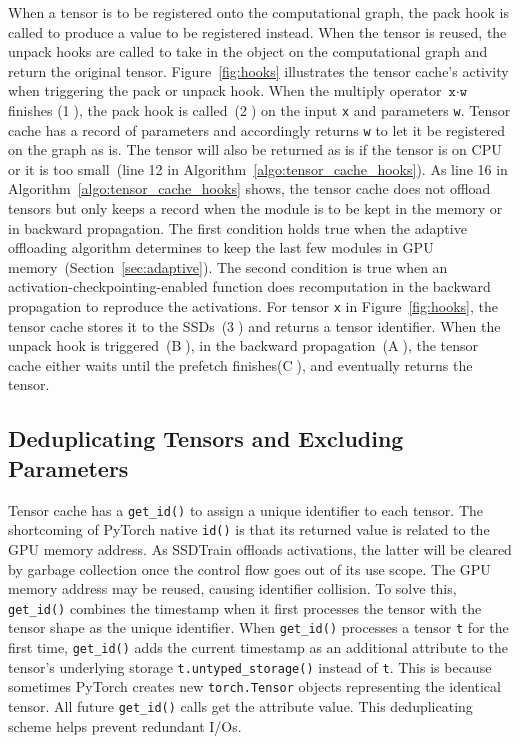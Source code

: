 When a tensor is to be registered onto the computational graph, the pack hook is called to produce a value to be registered instead.
When the tensor is reused, the unpack hooks are called to take in the object on the computational graph and return the original tensor.
Figure~\ref{fig:hooks} illustrates the tensor cache's activity when triggering the pack or unpack hook.
When the multiply operator $\texttt{x}\cdot\texttt{w}$ finishes (\textcircled{1}), the pack hook is called~(\textcircled{2}) on the input \texttt{x} and parameters \texttt{w}.
Tensor cache has a record of parameters and accordingly returns \texttt{w} to let it be registered on the graph as is.
The tensor will also be returned as is if the tensor is on CPU or it is too small~(line 12 in Algorithm~\ref{algo:tensor_cache_hooks}).
As line 16 in Algorithm~\ref{algo:tensor_cache_hooks} shows, the tensor cache does not offload tensors but only keeps a record when the module is to be kept in the memory or in backward propagation.
The first condition holds true when the adaptive offloading algorithm determines to keep the last few modules in GPU memory~(Section~\ref{sec:adaptive}).
The second condition is true when an activation-checkpointing-enabled function does recomputation in the backward propagation to reproduce the activations.
For tensor \texttt{x} in Figure~\ref{fig:hooks}, the tensor cache stores it to the SSDs~(\textcircled{3}) and returns a tensor identifier.
When the unpack hook is triggered~(\textcircled{B}), in the backward propagation~(\textcircled{A}), the tensor cache either waits until the prefetch finishes(\textcircled{C}), and eventually returns the tensor. 

\subsection{Deduplicating Tensors and Excluding Parameters}

Tensor cache has a \texttt{get\_id()}  to assign a unique identifier to each tensor.
The shortcoming of PyTorch native \texttt{id()} is that its returned value is related to the GPU memory address. As SSDTrain offloads activations, the latter will be cleared by garbage collection once the control flow goes out of its use scope.
The GPU memory address may be reused, causing identifier collision. 
To solve this, \texttt{get\_id()} combines the timestamp when it first processes the tensor with the tensor shape as the unique identifier. When \texttt{get\_id()} processes a tensor \texttt{t} for the first time, \texttt{get\_id()} adds the current timestamp as an additional attribute to the tensor's underlying storage \texttt{t.untyped\_storage()} instead of \texttt{t}.
This is because sometimes PyTorch creates new \texttt{torch.Tensor} objects representing the identical tensor.
All future \texttt{get\_id()} calls get the attribute value.
This deduplicating scheme helps prevent redundant I/Os.

